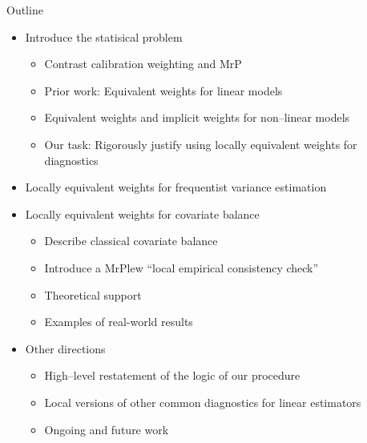 \begin{frame}{Outline}
%
%
\begin{itemize}
    \item Introduce the statisical problem
    \begin{itemize}
        \item Contrast calibration weighting and MrP
        \item Prior work: Equivalent weights for linear models
        \item Equivalent weights and implicit weights for non--linear models
        \item Our task: Rigorously justify using locally equivalent weights for diagnostics
    \end{itemize} \pause
    \item Locally equivalent weights for frequentist variance estimation \pause
    \item Locally equivalent weights for covariate balance
    \begin{itemize}
        \item Describe classical covariate balance
        \item Introduce a MrPlew ``local empirical consistency check''
        \item Theoretical support
        \item Examples of real-world results
    \end{itemize} \pause
    \item Other directions
    \begin{itemize}
            \item High--level restatement of the logic of our procedure
            \item Local versions of other common diagnostics for linear estimators
            \item Ongoing and future work
    \end{itemize}
\end{itemize}
%
\end{frame}
